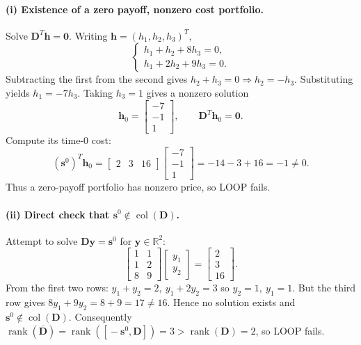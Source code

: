 \documentclass{article}
\begin{document}
\paragraph{(i) Existence of a zero payoff, nonzero cost portfolio.}
Solve \(\mathbf D^T\mathbf h=\mathbf 0\). Writing \(\mathbf h=(h_1,h_2,h_3)^T\),
\[
\begin{cases}
h_1+h_2+8h_3=0,\\[4pt]
h_1+2h_2+9h_3=0.
\end{cases}
\]
Subtracting the first from the second gives \(h_2+h_3=0\Rightarrow h_2=-h_3\). Substituting yields \(h_1=-7h_3\).
Taking \(h_3=1\) gives a nonzero solution
\[
\mathbf h_0=\begin{bmatrix}-7\\-1\\1\end{bmatrix},\qquad \mathbf D^T\mathbf h_0=\mathbf 0.
\]
Compute its time-0 cost:
\[
(\mathbf s^0)^T\mathbf h_0
=
\begin{bmatrix}2&3&16\end{bmatrix}
\begin{bmatrix}-7\\-1\\1\end{bmatrix}
=-14-3+16=-1\neq0.
\]
Thus a zero-payoff portfolio has nonzero price, so LOOP fails.

\paragraph{(ii) Direct check that \(\mathbf s^0\notin\operatorname{col}(\mathbf D)\).}
Attempt to solve \(\mathbf D\mathbf y=\mathbf s^0\) for \(\mathbf y\in\mathbb R^2\):
\[
\begin{bmatrix}1 & 1\\[4pt]1 & 2\\[4pt]8 & 9\end{bmatrix}
\begin{bmatrix}y_1\\y_2\end{bmatrix}
=
\begin{bmatrix}2\\3\\16\end{bmatrix}.
\]
From the first two rows: \(y_1+y_2=2,\ y_1+2y_2=3\) so \(y_2=1,\ y_1=1\). But the third row gives \(8y_1+9y_2=8+9=17\neq16\). Hence no solution exists and \(\mathbf s^0\notin\operatorname{col}(\mathbf D)\). Consequently \(\operatorname{rank}(\overline{\mathbf D})=\operatorname{rank}([\!-\mathbf s^0,\mathbf D\!])=3>\operatorname{rank}(\mathbf D)=2\), so LOOP fails.
\end{document}
